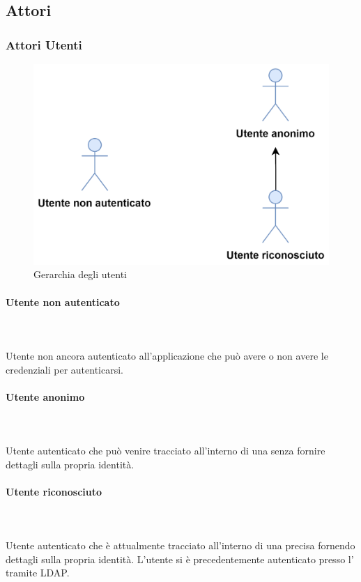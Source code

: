 \subsection{Attori}
\subsubsection{Attori Utenti}

\begin{figure}[h]
  \centering
    \includegraphics[scale=0.8]{Sezioni/UseCase/Immagini/Utenti.png}
    \caption{Gerarchia degli utenti}
\end{figure}

\paragraph{Utente non autenticato}\mbox{}\\ \\
Utente non ancora autenticato all'applicazione che può avere o non avere le credenziali per autenticarsi.
\paragraph{Utente anonimo}\mbox{}\\ \\
Utente autenticato che può venire tracciato all'interno di una  senza fornire dettagli sulla propria identità.
\paragraph{Utente riconosciuto}\mbox{}\\ \\
Utente autenticato che è attualmente tracciato all'interno di una precisa  fornendo dettagli sulla propria identità.
L'utente si è precedentemente autenticato presso l' tramite LDAP.



